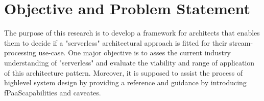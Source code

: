 \section{Objective and Problem Statement}

The purpose of this research is to develop a framework for architects that enables them to decide if a "serverless" architectural approach is fitted for their stream-processing use-case.
One major objective is to asses the current industry understanding of "serverless" and evaluate the viability and range of application of this architecture pattern.
Moreover, it is supposed to assist the process of highlevel system design by providing a reference and guidance by introducing fPaaS\footnotemark capabilities and caveates. 


